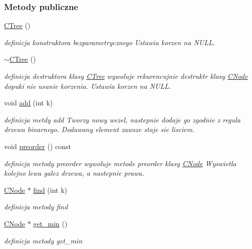 \subsubsection*{Metody publiczne}
\begin{DoxyCompactItemize}
\item 
\hyperlink{class_c_tree_a7d55c8fced3e483517850d43f3a36d21}{C\+Tree} ()
\begin{DoxyCompactList}\small\item\em definicja konstruktora bezparametrycznego Ustawia korzen na N\+U\+L\+L. \end{DoxyCompactList}\item 
\hyperlink{class_c_tree_a03282df290b747bb7a400919ec366af5}{$\sim$\+C\+Tree} ()
\begin{DoxyCompactList}\small\item\em definicja destruktora klasy \hyperlink{class_c_tree}{C\+Tree} wywoluje rekurencujnie destruktr klasy \hyperlink{class_c_node}{C\+Node} dopuki nie usunie korzenia. Ustawia korzen na N\+U\+L\+L. \end{DoxyCompactList}\item 
void \hyperlink{class_c_tree_a2aa140e1294873c16a6c086561186dc9}{add} (int k)
\begin{DoxyCompactList}\small\item\em definicja metdy add Tworzy nowy wezel, nastepnie dodaje go zgodnie z regula drzewa binarnego. Dodawany element zawsze staje sie lisciem. \end{DoxyCompactList}\item 
void \hyperlink{class_c_tree_a3570c57d0fb47bf3920ca0fd846d9bf3}{preorder} () const 
\begin{DoxyCompactList}\small\item\em definicja metody preorder wywoluje metode preorder klasy \hyperlink{class_c_node}{C\+Node} Wyswietla kolejno lewa galez drzewa, a nastepnie prawa. \end{DoxyCompactList}\item 
\hyperlink{class_c_node}{C\+Node} $\ast$ \hyperlink{class_c_tree_a728767cff939dca13a505c2427acf410}{find} (int k)
\begin{DoxyCompactList}\small\item\em definicja metody find \end{DoxyCompactList}\item 
\hyperlink{class_c_node}{C\+Node} $\ast$ \hyperlink{class_c_tree_a894b83cca3d899d797e99b93936afb4d}{get\+\_\+min} ()
\begin{DoxyCompactList}\small\item\em definicja metody get\+\_\+min \end{DoxyCompactList}\item 

\end{DoxyCompactItemize}
